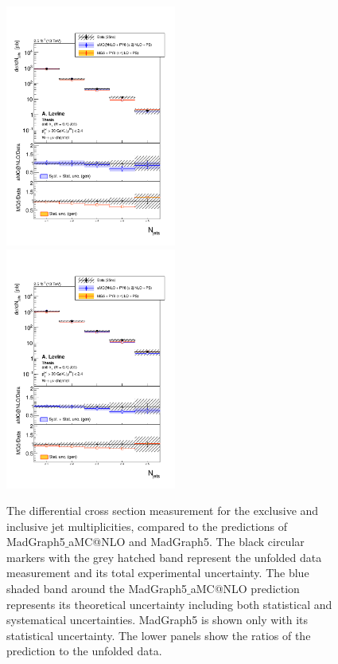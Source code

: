\documentclass[oneside, letterpaper, oldfontcommands]{memoir}
\begin{document}
\begin{figure}[hp]
    \includegraphics[width=0.5\textwidth]{SMu_unfolded_ZNGoodJetsFull_Zexc_Bayes_JetPtMin_30_JetEtaMax_24_MGPYTHIA6_.pdf}
    \includegraphics[width=0.5\textwidth]{SMu_unfolded_ZNGoodJetsFull_Zinc_Bayes_JetPtMin_30_JetEtaMax_24_MGPYTHIA6_.pdf}
    \caption{The differential cross section measurement for the exclusive and inclusive jet multiplicities, compared to the predictions of {\sc MadGraph5$\_$aMC@NLO} and {\sc MadGraph}5. The black circular markers with the grey hatched band represent the unfolded data measurement and its total experimental uncertainty. The blue shaded band around the {\sc MadGraph5$\_$aMC@NLO} prediction represents its theoretical uncertainty including both statistical and systematical uncertainties. {\sc MadGraph5} is shown only with its statistical uncertainty. The lower panels show the ratios of the prediction to the unfolded data.}
    \label{fig:xsec_Njets_nlo}
\end{figure}
\end{document}
